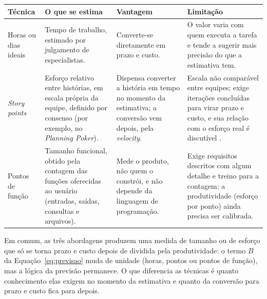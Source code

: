 \begin{quadro}[htbp]
  \caption{Comparação entre três formas de estimar o tamanho ou o esforço de
  uma funcionalidade}
  \label{quad:tecnicas}
  \small
  \begin{tabular}{@{}p{2.2cm}p{4.0cm}p{3.9cm}p{4.4cm}@{}}
    \toprule
    \textbf{Técnica} & \textbf{O que se estima} & \textbf{Vantagem} & \textbf{Limitação} \\
    \midrule
    \raggedright Horas ou dias ideais
      & \raggedright Tempo de trabalho, estimado por julgamento de especialistas.
      & \raggedright Converte-se diretamente em prazo e custo.
      & \raggedright O valor varia com quem executa a tarefa e tende a sugerir mais precisão do que a estimativa tem.
      \tabularnewline
    \addlinespace
    \raggedright \textit{Story points}
      & \raggedright Esforço relativo entre histórias, em escala própria da equipe, definido por consenso (por exemplo, no \textit{Planning Poker}).
      & \raggedright Dispensa converter a história em tempo no momento da estimativa; a conversão vem depois, pela \textit{velocity}.
      & \raggedright Escala não comparável entre equipes; exige iterações concluídas para virar prazo e custo, e sua relação com o esforço real é discutível \cite{tawosi2022}.
      \tabularnewline
    \addlinespace
    \raggedright Pontos de função
      & \raggedright Tamanho funcional, obtido pela contagem das funções oferecidas ao usuário (entradas, saídas, consultas e arquivos).
      & \raggedright Mede o produto, não quem o constrói, e não depende da linguagem de programação.
      & \raggedright Exige requisitos descritos com algum detalhe e treino para a contagem; a produtividade (esforço por ponto) ainda precisa ser calibrada.
      \tabularnewline
    \bottomrule
  \end{tabular}
  \par\vspace{1ex}
\end{quadro}

Em comum, as três abordagens produzem uma medida de tamanho ou de esforço que
só se torna prazo e custo depois de dividida pela produtividade: o termo $B$ da
Equação~\ref{eq:previsao} muda de unidade (horas, pontos ou pontos de função),
mas a lógica da previsão permanece. O que diferencia as técnicas é quanto
conhecimento elas exigem no momento da estimativa e quanto da conversão para
prazo e custo fica para depois.
